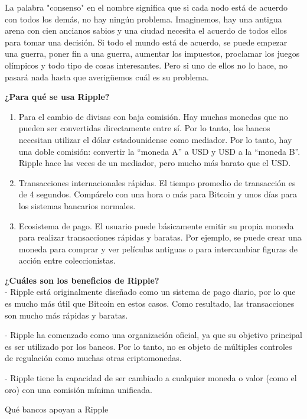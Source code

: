 \documentclass[a4paper,12pt]{/home/armando/Documentos/Cursos/LaTeX/Plantillas/lib/pub}
\begin{document}
	La palabra "consenso" en el nombre significa que si cada nodo está de acuerdo con todos los demás, no hay ningún problema. Imaginemos, hay una antigua arena con cien ancianos sabios y una ciudad necesita el acuerdo de todos ellos para tomar una decisión. Si todo el mundo está de acuerdo, se puede empezar una guerra, poner fin a una guerra, aumentar los impuestos, proclamar los juegos olímpicos y todo tipo de cosas interesantes. Pero si uno de ellos no lo hace, no pasará nada hasta que averigüemos cuál es su problema.
	
	\textbf{¿Para qué se usa Ripple?}\\
	\begin{enumerate}	
		\item Para el cambio de divisas con baja comisión. Hay muchas monedas que no pueden ser convertidas directamente entre sí. Por lo tanto, los bancos necesitan utilizar el dólar estadounidense como mediador. Por lo tanto, hay una doble comisión: convertir la “moneda A” a USD y USD a la “moneda B”. Ripple hace las veces de un mediador, pero mucho más barato que el USD.
		
		\item Transacciones internacionales rápidas. El tiempo promedio de transacción es de 4 segundos. Compárelo con una hora o más para Bitcoin y unos días para los sistemas bancarios normales.
		
		\item Ecosistema de pago. El usuario puede básicamente emitir su propia moneda para realizar transacciones rápidas y baratas. Por ejemplo, se puede crear una moneda para comprar y ver películas antiguas o para intercambiar figuras de acción entre coleccionistas.
	\end{enumerate}
	\textbf{¿Cuáles son los beneficios de Ripple?}\\
	
	- Ripple está originalmente diseñado como un sistema de pago diario, por lo que es mucho más útil que Bitcoin en estos casos. Como resultado, las transacciones son mucho más rápidas y baratas.
	
	- Ripple ha comenzado como una organización oficial, ya que su objetivo principal es ser utilizado por los bancos. Por lo tanto, no es objeto de múltiples controles de regulación como muchas otras criptomonedas.
	
	- Ripple tiene la capacidad de ser cambiado a cualquier moneda o valor (como el oro) con una comisión mínima unificada.
	
	Qué bancos apoyan a Ripple
	
\end{document}
